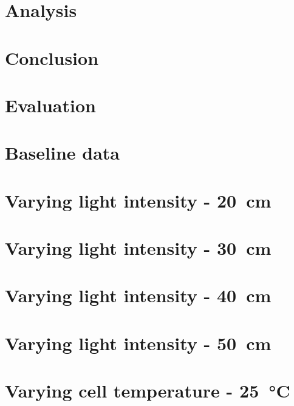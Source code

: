 \documentclass[a4paper,11pt]{article}
\begin{document}
\section{Analysis}


\section{Conclusion}


\section{Evaluation}


\begin{appendices}
    \label{appendix}
    \section{Baseline data}
    \label{dat:baseline}
    
    \section{Varying light intensity - \SI{20}{\centi\metre}}
    \label{dat:d20}
        
    \section{Varying light intensity - \SI{30}{\centi\metre}}
    \label{dat:d30}
        
    \section{Varying light intensity - \SI{40}{\centi\metre}}
    \label{dat:d40}
        
    \section{Varying light intensity - \SI{50}{\centi\metre}}
    \label{dat:d50}
        
    \section{Varying cell temperature - \SI{25}{\celsius}}
    \label{dat:t25}
        

\end{appendices}
\end{document}
